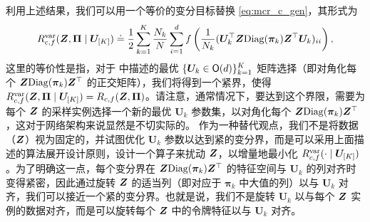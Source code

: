 \documentclass[../../book-main_zh.tex]{subfiles}
\begin{document}
利用上述结果，我们可以用一个等价的变分目标替换 \eqref{eq:mcr_c_gen}，其形式为
\vspace{-2mm}
\begin{equation}
    \label{eq:var_comp}
    R^{\rm var}_{c,f} (\bm{Z},\bm \Pi \mid \bm U_{[K]}) \doteq \frac{1}{2}\sum_{k=1}^K \frac{N_k}{N} \sum_{i=1}^{d} f\left(\frac{1}{N_k} (\bm U_{k}^{\top} \bm{Z} \mathrm{Diag}(\bm \pi_k) \bm Z^{\top} \bm U_{k})_{ii} \right),
\end{equation}
这里的等价性是指，对于  中描述的最优 $\{ \bm U_k \in \mathsf{O}(d)\}_{k=1}^K$ 矩阵选择（即对角化每个 $\bm{Z} \mathrm{Diag}(\bm \pi_k) \bm{Z}^\top $ 的正交矩阵），我们将得到一个紧界，使得 $ R^{\rm var}_{c,f} (\bm{Z},\bm \Pi \mid \bm U_{[K]}) = R_{c,f} (\bm{Z},\bm \Pi)$。请注意，通常情况下，要达到这个界限，需要为每个 $\bm{Z}$ 的采样实例选择一个新的最优 $\bm U_{k}$ 参数集，以对角化每个 $\bm{Z}\mathrm{Diag}(\bm \pi_{k})\bm{Z}^{\top}$，这对于网络架构来说显然是不切实际的。
作为一种替代观点，我们不是将数据（$\bm{Z}$）视为固定的，并试图优化 $\bm U_k$ 参数以达到紧的变分界，而是可以采用上面描述的算法展开设计原则，设计一个算子来扰动 $\bm{Z}$，以增量地最小化 $R_{c, f}^{\rm var}(\cdot \mid \bm U_{[K]})$。为了明确这一点，每个变分界在 $\bm{Z} \mathrm{Diag}(\bm \pi_k) \bm{Z}^\top$ 的特征空间与 $\bm U_k$ 的列对齐时变得紧密，因此通过旋转 $\bm{Z}$ 的适当列（即对应于 $\bm \pi_k$ 中大值的列）以与 $\bm U_k$ 对齐，我们可以接近一个紧的变分界。也就是说，我们不是旋转 $\bm U_k$ 以与每个 $\bm{Z}$ 实例的数据对齐，而是可以旋转每个 $\bm{Z}$ 中的令牌特征以与 $\bm U_k$ 对齐。
\end{document}
